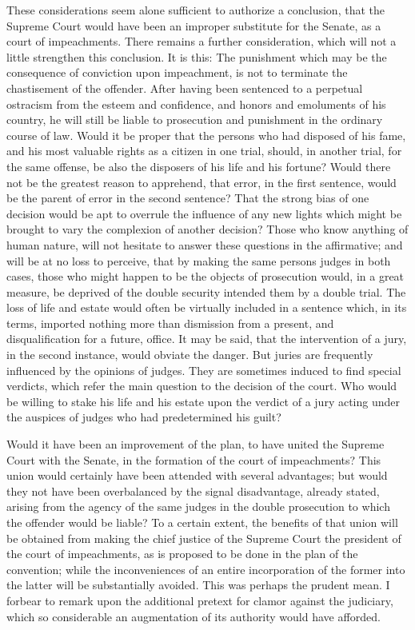 These considerations seem alone sufficient to authorize a conclusion, that the Supreme Court would have been an improper substitute for the Senate, as a court of impeachments. There remains a further consideration, which will not a little strengthen this conclusion. It is this: The punishment which may be the consequence of conviction upon impeachment, is not to terminate the chastisement of the offender. After having been sentenced to a perpetual ostracism from the esteem and confidence, and honors and emoluments of his country, he will still be liable to prosecution and punishment in the ordinary course of law. Would it be proper that the persons who had disposed of his fame, and his most valuable rights as a citizen in one trial, should, in another trial, for the same offense, be also the disposers of his life and his fortune? Would there not be the greatest reason to apprehend, that error, in the first sentence, would be the parent of error in the second sentence? That the strong bias of one decision would be apt to overrule the influence of any new lights which might be brought to vary the complexion of another decision? Those who know anything of human nature, will not hesitate to answer these questions in the affirmative; and will be at no loss to perceive, that by making the same persons judges in both cases, those who might happen to be the objects of prosecution would, in a great measure, be deprived of the double security intended them by a double trial. The loss of life and estate would often be virtually included in a sentence which, in its terms, imported nothing more than dismission from a present, and disqualification for a future, office. It may be said, that the intervention of a jury, in the second instance, would obviate the danger. But juries are frequently influenced by the opinions of judges. They are sometimes induced to find special verdicts, which refer the main question to the decision of the court. Who would be willing to stake his life and his estate upon the verdict of a jury acting under the auspices of judges who had predetermined his guilt?

Would it have been an improvement of the plan, to have united the Supreme Court with the Senate, in the formation of the court of impeachments? This union would certainly have been attended with several advantages; but would they not have been overbalanced by the signal disadvantage, already stated, arising from the agency of the same judges in the double prosecution to which the offender would be liable? To a certain extent, the benefits of that union will be obtained from making the chief justice of the Supreme Court the president of the court of impeachments, as is proposed to be done in the plan of the convention; while the inconveniences of an entire incorporation of the former into the latter will be substantially avoided. This was perhaps the prudent mean. I forbear to remark upon the additional pretext for clamor against the judiciary, which so considerable an augmentation of its authority would have afforded.

